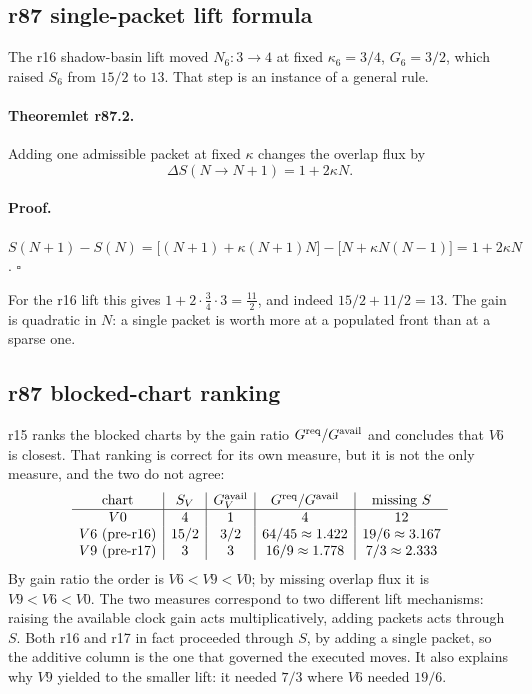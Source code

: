\subsection*{r87 single-packet lift formula}
\label{subsec:r87-single-packet-lift}

The r16 shadow-basin lift moved \(N_6:3\to4\) at fixed \(\kappa_6=3/4\), \(G_6=3/2\), which
raised \(S_6\) from \(15/2\) to \(13\).  That step is an instance of a general rule.

\paragraph{Theoremlet r87.2.}
Adding one admissible packet at fixed \(\kappa\) changes the overlap flux by
\[
\Delta S(N\to N+1)=1+2\kappa N .
\]

\paragraph{Proof.}
\(S(N+1)-S(N)=\bigl[(N+1)+\kappa(N+1)N\bigr]-\bigl[N+\kappa N(N-1)\bigr]=1+2\kappa N\).
\(\square\)

For the r16 lift this gives \(1+2\cdot\tfrac34\cdot3=\tfrac{11}{2}\), and indeed
\(15/2+11/2=13\).  The gain is quadratic in \(N\): a single packet is worth more at a
populated front than at a sparse one.

\subsection*{r87 blocked-chart ranking}
\label{subsec:r87-blocked-ranking}

r15 ranks the blocked charts by the gain ratio \(G^{\rm req}/G^{\rm avail}\) and concludes
that \(V6\) is closest.  That ranking is correct for its own measure, but it is not the only
measure, and the two do not agree:
\[
\begin{array}{c|c|c|c|c}
\text{chart} & S_V & G_V^{\rm avail} &
G^{\rm req}/G^{\rm avail} & \text{missing }S\\
\hline
V0 & 4 & 1 & 4 & 12\\
V6\ (\text{pre-r16}) & 15/2 & 3/2 & 64/45\approx1.422 & 19/6\approx3.167\\
V9\ (\text{pre-r17}) & 3 & 3 & 16/9\approx1.778 & 7/3\approx2.333
\end{array}
\]
By gain ratio the order is \(V6<V9<V0\); by missing overlap flux it is \(V9<V6<V0\).  The
two measures correspond to two different lift mechanisms: raising the available clock gain
acts multiplicatively, adding packets acts through \(S\).  Both r16 and r17 in fact proceeded
through \(S\), by adding a single packet, so the additive column is the one that governed the
executed moves.  It also explains why \(V9\) yielded to the smaller lift: it needed \(7/3\)
where \(V6\) needed \(19/6\).

